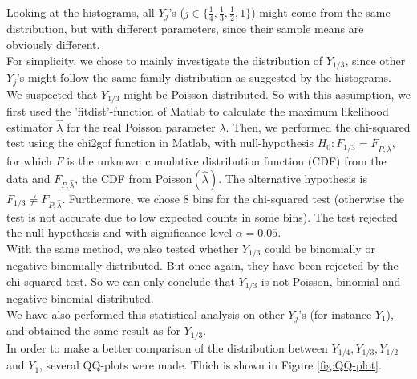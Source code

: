 Looking at the histograms, all $Y_j$'s ($j\in \{\frac{1}{4},\frac{1}{3},\frac{1}{2},1\}$) might come from the same distribution, but with different parameters, since their sample means are obviously different.\\

For simplicity, we chose to mainly investigate the distribution of $Y_{1/3}$, since other $Y_j$'s might follow the same family distribution as suggested by the histograms. We suspected that $Y_{1/3}$ might be Poisson distributed. So with this assumption, we first used the 'fitdist'-function of Matlab to calculate the maximum likelihood estimator $\hat{\lambda}$ for the real Poisson parameter $\lambda$. Then, we performed the chi-squared test using the chi2gof function in Matlab, with null-hypothesis $H_0:F_{1/3}=F_{P,\hat{\lambda}}$, for which $F$ is the unknown cumulative distribution function (CDF) from the data and $F_{P,\hat{\lambda}}$, the CDF from Poisson$(\hat{\lambda})$. The alternative hypothesis is $F_{1/3}\neq F_{P,\hat{\lambda}}$. Furthermore, we chose 8 bins for the chi-squared test (otherwise the test is not accurate due to low expected counts in some bins). The test rejected the null-hypothesis and with significance level $\alpha=0.05$. \\   

With the same method, we also tested whether $Y_{1/3}$ could be binomially or negative binomially distributed. But once again, they have been rejected by the chi-squared test. So we can only conclude that $Y_{1/3}$ is not Poisson, binomial and negative binomial distributed.\\
We have also performed this statistical analysis on other $Y_j$'s (for instance $Y_1$), and  obtained the same result as for $Y_{1/3}$.\\

In order to make a better comparison of the distribution between $Y_{1/4},Y_{1/3},Y_{1/2}$ and $Y_1$, several QQ-plots were made. Thich is shown in Figure \ref{fig:QQ-plot}.\\ 

